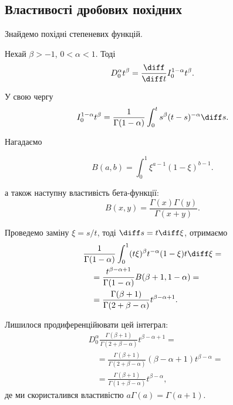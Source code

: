 \subsection{Властивості дробових похідних}
\begin{example}
    Знайдемо похідні степеневих функцій.
\end{example}
\begin{solution}
    Нехай $\beta > -1$, $0 < \alpha < 1$. Тоді
    \begin{equation}
        D_0^\alpha t^\beta = \frac{\diff}{\diff t} I_0^{1-\alpha} t^\beta.
    \end{equation}
    
    У свою чергу
    \begin{equation}
        I_0^{1-\alpha} t^\beta = \frac{1}{\Gamma(1 - \alpha)} \int_0^t s^\beta (t- s)^{-\alpha} \diff s.
    \end{equation}
    
    Нагадаємо
    \begin{definition}
        \begin{equation}
            B(a,b) = \int_0^1 \xi^{a-1}(1-\xi)^{b-1}.
        \end{equation}
    \end{definition}
    а також наступну властивість бета-функції:
    \begin{equation}
        B(x,y) = \frac {\Gamma (x) \Gamma (y)}{\Gamma (x + y)}.
    \end{equation}
    
    Проведемо заміну $\xi = s / t$, тоді $\diff s = t \diff \xi$, отримаємо
    \begin{equation}
        \begin{aligned}
            & \frac{1}{\Gamma(1-\alpha)} \int_0^1 (t \xi)^\beta t^{-\alpha} (1 - \xi) t \diff \xi = \\
            &\quad = \frac{t^{\beta - \alpha + 1}}{\Gamma(1 - \alpha)} B(\beta + 1, 1 - \alpha) = \\
            &\quad = \frac{\Gamma(\beta + 1)}{\Gamma(2 + \beta - \alpha)} t^{\beta - \alpha + 1}.
        \end{aligned}
    \end{equation}
    
    Лишилося продиференційювати цей інтеграл:
    \begin{equation}
        \begin{aligned}
            & D_0^\alpha \frac{\Gamma(\beta + 1)}{\Gamma(2 + \beta - \alpha)} t^{\beta - \alpha + 1} = \\
            &\quad = \frac{\Gamma(\beta + 1)}{\Gamma(2 + \beta - \alpha)} (\beta - \alpha + 1) t^{\beta - \alpha} = \\
            &\quad = \frac{\Gamma(\beta + 1)}{\Gamma(1 + \beta - \alpha)} t^{\beta - \alpha},
        \end{aligned}
    \end{equation}
    де ми скористалився властивістю $a \Gamma(a) = \Gamma(a + 1)$.
\end{solution}

